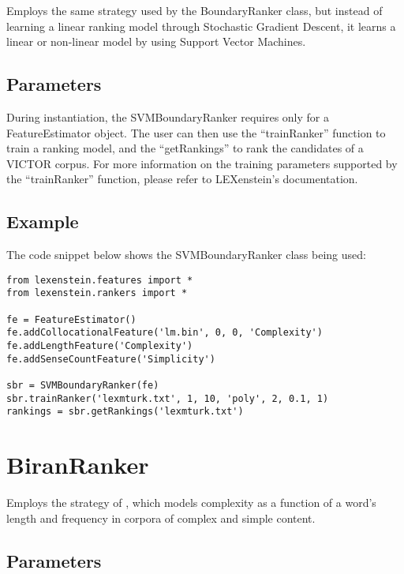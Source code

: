 Employs the same strategy used by the BoundaryRanker class, but instead of learning a linear ranking model through Stochastic Gradient Descent, it learns a linear or non-linear model by using Support Vector Machines.

\subsection{Parameters}

During instantiation, the SVMBoundaryRanker requires only for a FeatureEstimator object. The user can then use the ``trainRanker'' function to train a ranking model, and the ``getRankings'' to rank the candidates of a VICTOR corpus. For more information on the training parameters supported by the ``trainRanker'' function, please refer to LEXenstein's documentation.

\subsection{Example}

The code snippet below shows the SVMBoundaryRanker class being used:

\begin{lstlisting}
from lexenstein.features import *
from lexenstein.rankers import *

fe = FeatureEstimator()
fe.addCollocationalFeature('lm.bin', 0, 0, 'Complexity')
fe.addLengthFeature('Complexity')
fe.addSenseCountFeature('Simplicity')

sbr = SVMBoundaryRanker(fe)
sbr.trainRanker('lexmturk.txt', 1, 10, 'poly', 2, 0.1, 1)
rankings = sbr.getRankings('lexmturk.txt')
\end{lstlisting}











\section{BiranRanker}

Employs the strategy of \cite{Biran2011}, which models complexity as a function of a word's length and frequency in corpora of complex and simple content. 

\subsection{Parameters}

